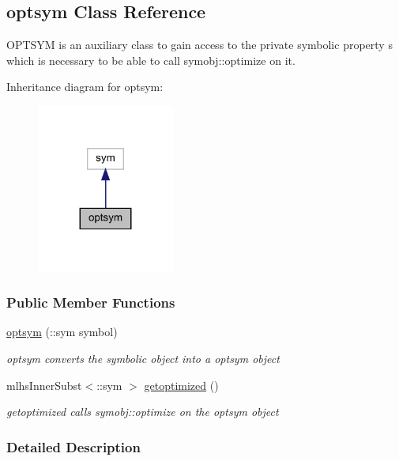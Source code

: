\hypertarget{classoptsym}{}\subsection{optsym Class Reference}
\label{classoptsym}


O\+P\+T\+S\+YM is an auxiliary class to gain access to the private symbolic property {\ttfamily s} which is necessary to be able to call symobj\+::optimize on it.  




Inheritance diagram for optsym\+:
\nopagebreak
\begin{figure}[H]
\begin{center}
\leavevmode
\includegraphics[width=128pt]{classoptsym__inherit__graph}
\end{center}
\end{figure}
\subsubsection*{Public Member Functions}
\begin{DoxyCompactItemize}
\item 
\mbox{\hyperlink{classoptsym_afe9ab2368d1b1705d6a38ae4ed7dcb37}{optsym}} (\+::sym symbol)
\begin{DoxyCompactList}\small\item\em optsym converts the symbolic object into a optsym object \end{DoxyCompactList}\item 
mlhs\+Inner\+Subst$<$\+::sym $>$ \mbox{\hyperlink{classoptsym_a9025fce18af7d11fcca43332aece29bc}{getoptimized}} ()
\begin{DoxyCompactList}\small\item\em getoptimized calls symobj\+::optimize on the optsym object \end{DoxyCompactList}\end{DoxyCompactItemize}


\subsubsection{Detailed Description}


